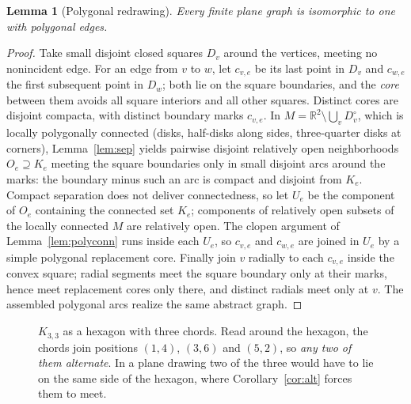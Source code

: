 \documentclass[11pt,a4paper]{article}
\theoremstyle{jsplain}
\newtheorem{lemma}[theorem]{Lemma}
\theoremstyle{jsdefn}
\begin{document}
\begin{lemma}[Polygonal redrawing]\label{lem:redraw}
Every finite plane graph is isomorphic to one with polygonal edges.
\end{lemma}
\begin{proof}
Take small disjoint closed squares $D_v$ around the vertices, meeting
no nonincident edge. For an edge from $v$ to $w$, let $c_{v,e}$ be its
last point in $D_v$ and $c_{w,e}$ the first subsequent point in
$D_w$; both lie on the square boundaries, and the \emph{core} between
them avoids all square interiors and all other squares. Distinct cores
are disjoint compacta, with distinct boundary marks $c_{v,e}$. In
$M=\mathbb R^2\setminus\bigcup_vD_v^\circ$, which is locally
polygonally connected (disks, half-disks along sides, three-quarter
disks at corners), Lemma~\ref{lem:sep} yields pairwise disjoint
relatively open neighborhoods $O_e\supseteq K_e$ meeting the square
boundaries only in small disjoint arcs around the marks: the boundary
minus such an arc is compact and disjoint from $K_e$. Compact
separation does not deliver connectedness, so let $U_e$ be the
component of $O_e$ containing the connected set $K_e$; components of
relatively open subsets of the locally connected $M$ are relatively
open. The
clopen argument of Lemma~\ref{lem:polyconn} runs inside each $U_e$, so
$c_{v,e}$ and $c_{w,e}$ are joined in $U_e$ by a simple polygonal
replacement core. Finally join $v$ radially to each $c_{v,e}$ inside
the convex square; radial segments meet the square boundary only at
their marks, hence meet replacement cores only there, and distinct
radials meet only at $v$. The assembled polygonal arcs realize the
same abstract graph.
\end{proof}

\begin{figure}[t]
\centering
{}
\caption{$K_{3,3}$ as a hexagon with three chords. Read around the
hexagon, the chords join positions $(1,4)$, $(3,6)$ and $(5,2)$, so
\emph{any two of them alternate}. In a plane drawing two of the three
would have to lie on the same side of the hexagon, where
Corollary~\ref{cor:alt} forces them to
meet.}\label{fig:k33}
\end{figure}
\end{document}

